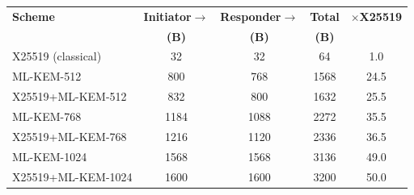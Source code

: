 \begin{tabular}{|l|c|c|c|c|}
\hline
\textbf{Scheme} & \textbf{Initiator$\rightarrow$} & \textbf{Responder$\rightarrow$} & \textbf{Total} & \textbf{$\times$X25519} \\
 & \textbf{(B)} & \textbf{(B)} & \textbf{(B)} & \\
\hline
X25519 (classical) & 32 & 32 & 64 & 1.0 \\ \hline
ML-KEM-512 & 800 & 768 & 1568 & 24.5 \\ \hline
X25519+ML-KEM-512 & 832 & 800 & 1632 & 25.5 \\ \hline
ML-KEM-768 & 1184 & 1088 & 2272 & 35.5 \\ \hline
X25519+ML-KEM-768 & 1216 & 1120 & 2336 & 36.5 \\ \hline
ML-KEM-1024 & 1568 & 1568 & 3136 & 49.0 \\ \hline
X25519+ML-KEM-1024 & 1600 & 1600 & 3200 & 50.0 \\ \hline
\end{tabular}
